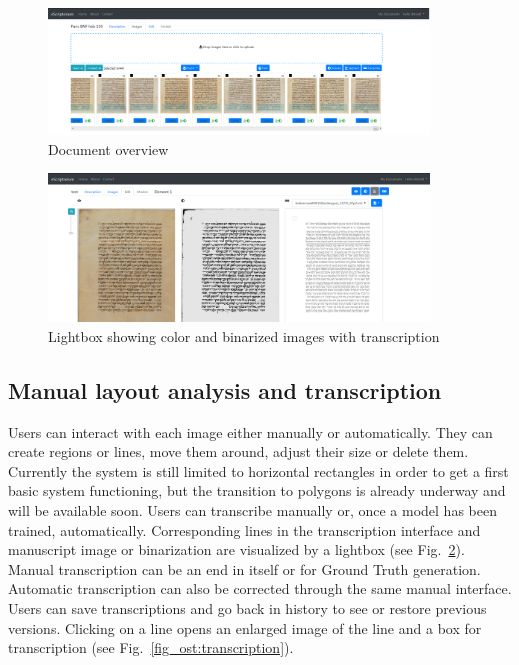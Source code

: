 \begin{figure}
	\centering
	\includegraphics[width=0.9\textwidth]{overview_BNF_150.png}
	\caption{Document overview}
	\label{fig_ost:overview}
\end{figure}

\begin{figure}
	\centering
	\includegraphics[width=0.9\textwidth]{synch_lines.png}
	\caption{Lightbox showing color and binarized images with transcription}
	\label{fig_ost:lightbox}
\end{figure}

\subsection{Manual layout analysis and transcription}

Users can interact with each image either manually or automatically. They can
create regions or lines, move them around, adjust their size or delete them.
Currently the system is still limited to horizontal rectangles in order to get
a first basic system functioning, but the transition to polygons is already
underway and will be available soon. Users can transcribe manually or, once a
model has been trained, automatically. Corresponding lines in the transcription
interface and manuscript image or binarization are visualized by a lightbox
(see Fig.~\ref{fig_ost:lightbox}). Manual transcription can be an end in itself
or for Ground Truth generation. Automatic transcription can also be corrected
through the same manual interface. Users can save transcriptions and go back in
history to see or restore previous versions. Clicking on a line opens an
enlarged image of the line and a box for transcription (see Fig.~\ref{fig_ost:transcription}).

